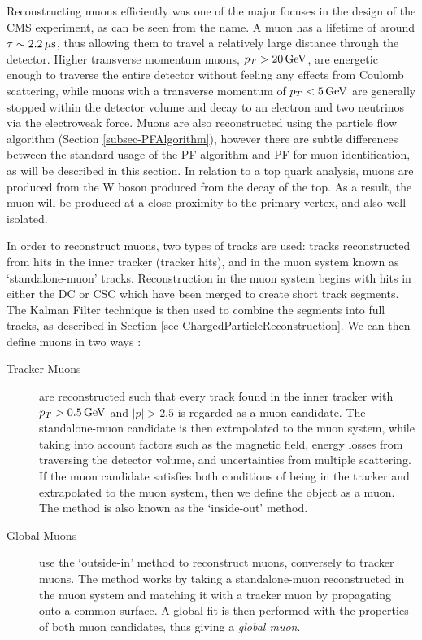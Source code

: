 Reconstructing muons efficiently was one of the major focuses in the design of the CMS experiment, as can be seen from the name. A muon has a lifetime of around $\tau \sim 2.2 \,\mu\text{s}$, thus allowing them to travel a relatively large distance through the detector. Higher transverse momentum muons, $p_T > 20 \,\text{Ge\hspace{-.08em}V}$, are energetic enough to traverse the entire detector without feeling any effects from Coulomb scattering, while muons with a transverse momentum of $p_T < 5 \,\text{Ge\hspace{-.08em}V}$ are generally stopped within the detector volume and decay to an electron and two neutrinos via the electroweak force. Muons are also reconstructed using the particle flow algorithm (Section \ref{subsec-PFAlgorithm}), however there are subtle differences between the standard usage of the PF algorithm and PF for muon identification, as will be described in this section. In relation to a top quark analysis, muons are produced from the W boson produced from the decay of the top. As a result, the muon will be produced at a close proximity to the primary vertex, and also well isolated. 

In order to reconstruct muons, two types of tracks are used: tracks reconstructed from hits in the inner tracker (tracker hits), and in the muon system known as `standalone-muon' tracks. Reconstruction in the muon system begins with hits in either the DC or CSC which have been merged to create short track segments. The Kalman Filter technique is then used to combine the segments into full tracks, as described in Section \ref{sec-ChargedParticleReconstruction}. We can then define muons in two ways \cite{1748-0221-7-10-P10002}: 

\begin{description}
	\item[Tracker Muons] are reconstructed such that every track found in the inner tracker with $p_T > 0.5 \,\text{Ge\hspace{-.08em}V}$ and $|p| > 2.5$ is regarded as a muon candidate. The standalone-muon candidate is then extrapolated to the muon system, while taking into account factors such as the magnetic field, energy losses from traversing the detector volume, and uncertainties from multiple scattering. If the muon candidate satisfies both conditions of being in the tracker and extrapolated to the muon system, then we define the object as a muon. The method is also known as the `inside-out' method.
	\item[Global Muons] use the `outside-in' method to reconstruct muons, conversely to tracker muons. The method works by taking a standalone-muon reconstructed in the muon system and matching it with a tracker muon by propagating onto a common surface. A global fit is then performed with the properties of both muon candidates, thus giving a \emph{global muon}. 
\end{description}

